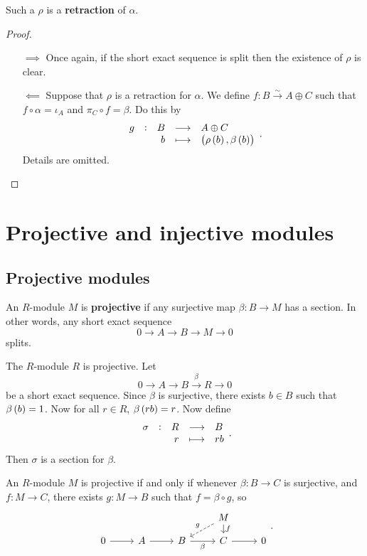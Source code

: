 Such a $ \rho $ is a \textbf{retraction} of $ \alpha $.

\begin{proof}
\hfill
\begin{itemize}
\item[$ \implies $] Once again, if the short exact sequence is split then the existence of $ \rho $ is clear.
\item[$ \impliedby $] Suppose that $ \rho $ is a retraction for $ \alpha $. We define $ f : B \xrightarrow{\sim} A \oplus C $ such that $ f \circ \alpha = \iota_A $ and $ \pi_C \circ f = \beta $. Do this by
$$ \function[g]{B}{A \oplus C}{b}{\br{\rho\br{b}, \beta\br{b}}}. $$
Details are omitted.
\end{itemize}
\end{proof}

\pagebreak

\section{Projective and injective modules}

\subsection{Projective modules}


\begin{definition}
An $ R $-module $ M $ is \textbf{projective} if any surjective map $ \beta : B \to M $ has a section. In other words, any short exact sequence
$$ 0 \to A \to B \to M \to 0 $$
splits.
\end{definition}

\begin{example*}
The $ R $-module $ R $ is projective. Let
$$ 0 \to A \to B \xrightarrow{\beta} R \to 0 $$
be a short exact sequence. Since $ \beta $ is surjective, there exists $ b \in B $ such that $ \beta\br{b} = 1 $. Now for all $ r \in R $, $ \beta\br{rb} = r $. Now define
$$ \function[\sigma]{R}{B}{r}{rb}. $$
Then $ \sigma $ is a section for $ \beta $.
\end{example*}

\begin{proposition}
An $ R $-module $ M $ is projective if and only if whenever $ \beta : B \to C $ is surjective, and $ f : M \to C $, there exists $ g : M \to B $ such that $ f = \beta \circ g $, so
$$
\begin{tikzcd}[row sep=small]
& & & M \arrow[dashed]{dl}[swap]{g} \arrow{d}{f} & \\
0 \arrow{r} & A \arrow{r} & B \arrow{r}[swap]{\beta} & C \arrow{r} & 0
\end{tikzcd}.
$$
\end{proposition}

